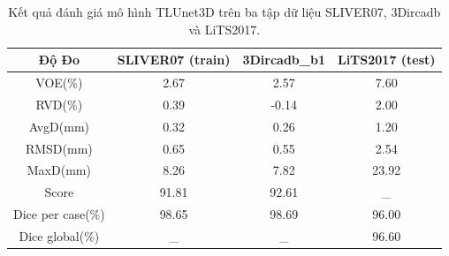 \begin{table}[]
\begin{tabular}{|c|c|c|c|}
\hline
\textbf{Độ Đo} & \textbf{SLIVER07 (train)} & \textbf{3Dircadb\_b1} & \textbf{LiTS2017 (test)} \\ \hline
VOE(\%)            & 2.67                      & 2.57                  & 7.60                     \\ \hline
RVD(\%)            & 0.39                      & -0.14                 & 2.00                     \\ \hline
AvgD(mm)           & 0.32                      & 0.26                  & 1.20                     \\ \hline
RMSD(mm)           & 0.65                      & 0.55                  & 2.54                     \\ \hline
MaxD(mm)           & 8.26                      & 7.82                  & 23.92                    \\ \hline
Score          & 91.81                     & 92.61                 & \_                       \\ \hline
Dice per case(\%)  & 98.65                     & 98.69                 & 96.00                    \\ \hline
Dice global(\%)    & \_                        & \_                    & 96.60                     \\ \hline
\end{tabular}
\caption{\label{tab:CNN-SLIVER07_Test}Kết quả đánh giá mô hình TLUnet3D trên ba tập dữ liệu SLIVER07, 3Dircadb và LiTS2017.}
\end{table}





